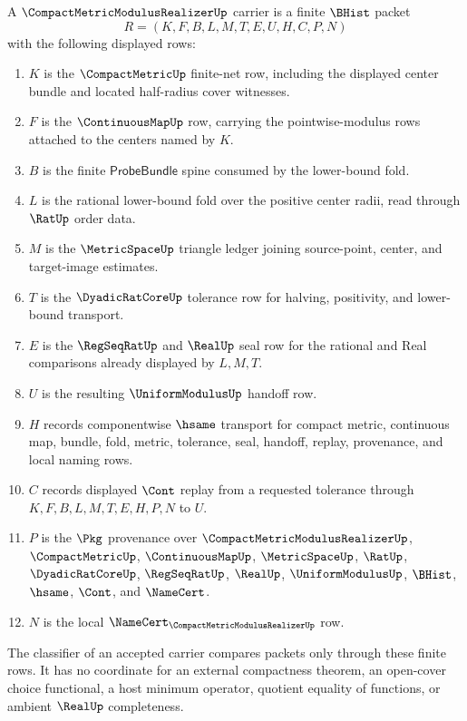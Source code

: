 \begin{definition}
\label{def:compact-metric-modulus-realizer-carrier}
A $\CompactMetricModulusRealizerUp$ carrier is a finite $\BHist$ packet
$$
R=(K,F,B,L,M,T,E,U,H,C,P,N)
$$
with the following displayed rows:
\begin{enumerate}
\item $K$ is the $\CompactMetricUp$ finite-net row, including the displayed center bundle and located half-radius cover witnesses.
\item $F$ is the $\ContinuousMapUp$ row, carrying the pointwise-modulus rows attached to the centers named by $K$.
\item $B$ is the finite $\mathsf{ProbeBundle}$ spine consumed by the lower-bound fold.
\item $L$ is the rational lower-bound fold over the positive center radii, read through $\RatUp$ order data.
\item $M$ is the $\MetricSpaceUp$ triangle ledger joining source-point, center, and target-image estimates.
\item $T$ is the $\DyadicRatCoreUp$ tolerance row for halving, positivity, and lower-bound transport.
\item $E$ is the $\RegSeqRatUp$ and $\RealUp$ seal row for the rational and Real comparisons already displayed by $L,M,T$.
\item $U$ is the resulting $\UniformModulusUp$ handoff row.
\item $H$ records componentwise $\hsame$ transport for compact metric, continuous map, bundle, fold, metric, tolerance, seal, handoff, replay, provenance, and local naming rows.
\item $C$ records displayed $\Cont$ replay from a requested tolerance through $K,F,B,L,M,T,E,H,P,N$ to $U$.
\item $P$ is the $\Pkg$ provenance over $\CompactMetricModulusRealizerUp$, $\CompactMetricUp$, $\ContinuousMapUp$, $\MetricSpaceUp$, $\RatUp$, $\DyadicRatCoreUp$, $\RegSeqRatUp$, $\RealUp$, $\UniformModulusUp$, $\BHist$, $\hsame$, $\Cont$, and $\NameCert$.
\item $N$ is the local $\NameCert_{\CompactMetricModulusRealizerUp}$ row.
\end{enumerate}
The classifier of an accepted carrier compares packets only through these finite rows. It has no coordinate for an external compactness theorem, an open-cover choice functional, a host minimum operator, quotient equality of functions, or ambient $\RealUp$ completeness.
\end{definition}

